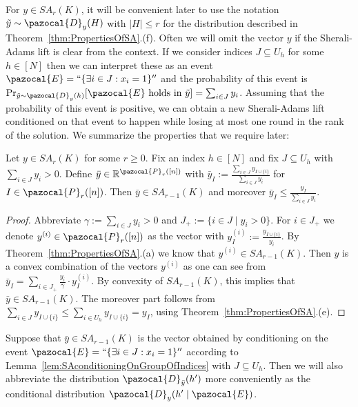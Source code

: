     For $y \in SA_r(K)$, it will be convenient later to use the notation $\tilde{y} \sim \pazocal{D}_{y}(H)$ with $|H| \leq r$ for the distribution described in Theorem~\ref{thm:PropertiesOfSA}.(f). Often we will omit the vector $y$ if the
    Sherali-Adams lift is clear from the context. 
    If we consider indices $J \subseteq U_h$ for some $h \in [N]$ then we can interpret these as an event $\pazocal{E} = ``\{ \exists i \in J: x_i=1\}''$ and the probability of this event is $\Pr_{\tilde{y} \sim \pazocal{D}_y(h)}[\pazocal{E}\textrm{ holds in }\tilde{y}] = \sum_{i \in J} y_{i}$. Assuming that the probability of this event is positive, we can obtain a new Sherali-Adams lift conditioned on that event to happen while losing at most one round in the rank of the solution.
    We summarize the properties that we require later: 
    \begin{lemma} \label{lem:SAconditioningOnGroupOfIndices}
      Let $y \in SA_r(K)$ for some $r \geq 0$. Fix an index $h \in [N]$ and fix $J \subseteq U_h$ with $\sum_{i \in J} y_i > 0$.
      Define $\bar{y} \in \setR^{\pazocal{P}_{r}([n])}$ with $\bar{y}_{I} := \frac{\sum_{i \in J}y_{I\cup\{i\}}}{\sum_{i \in J} y_i}$ for $I \in \pazocal{P}_{r}([n])$. Then  $\bar{y} \in SA_{r-1}(K)$ and moreover $\bar{y}_I \leq \frac{y_I}{\sum_{i \in J} y_i}$.  
    \end{lemma}
    \begin{proof}
      Abbreviate $\gamma := \sum_{i \in J} y_i> 0$ and $J_+ := \{ i \in J \mid y_i > 0\}$. For $i \in J_+$ we denote $y^{(i)} \in \pazocal{P}_r([n])$ as the vector with $y^{(i)}_I := \frac{y_{I \cup \{ i\}}}{y_{i}}$. By Theorem~\ref{thm:PropertiesOfSA}.(a) we know that $y^{(i)} \in SA_{r-1}(K)$. Then $y$ is a convex combination of the vectors $y^{(i)}$ as one can see from $\bar{y}_I = \sum_{i \in J_+} \frac{y_i}{\gamma} \cdot y^{(i)}_I$.
      By convexity of  $SA_{r-1}(K)$, this implies that $\bar{y} \in SA_{r-1}(K)$.
      The moreover part follows from $\sum_{i \in J} y_{I \cup \{ i\}} \leq \sum_{i \in U_h} y_{I \cup \{ i\}} = y_I$, using Theorem~\ref{thm:PropertiesOfSA}.(e).
    \end{proof}
    Suppose that $\bar{y} \in SA_{r-1}(K)$ is the vector obtained by conditioning on the event $\pazocal{E} = ``\{ \exists i \in J: x_i=1\}''$ according to Lemma~\ref{lem:SAconditioningOnGroupOfIndices} with $J \subseteq U_h$.
    Then we will also abbreviate the distribution $\pazocal{D}_{\bar{y}}(h')$ more conveniently as the conditional distribution  $\pazocal{D}_{y}(h' \mid \pazocal{E})$.
  

